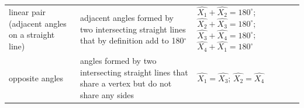 {\begin{tabular}[t]{|l|l|l|}
        linear pair (adjacent angles on a straight line) &
        adjacent angles formed by two intersecting straight lines that by definition add to 180\begin{math}{}^{\circ }\end{math} &
                  \begin{math}\hat{{X}_{1}}+\hat{{X}_{2}}={180}^{\circ }\end{math};
                  \begin{math}\hat{{X}_{2}}+\hat{{X}_{3}}={180}^{\circ }\end{math};
                  \begin{math}\hat{{X}_{3}}+\hat{{X}_{4}}={180}^{\circ }\end{math};
                  \begin{math}\hat{{X}_{4}}+\hat{{X}_{1}}={180}^{\circ }\end{math}
     \tabularnewline\cline{1-1}\cline{2-2}\cline{3-3}
        opposite angles &
        angles formed by two intersecting straight lines that share a vertex but do not share any sides &
                  \begin{math}\hat{{X}_{1}}=\hat{{X}_{3}}\end{math};
                  \begin{math}\hat{{X}_{2}}=\hat{{X}_{4}}\end{math}

\end{tabular}}

